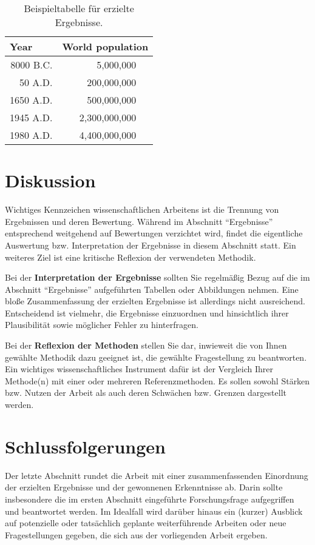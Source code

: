 \documentclass{svproc}
\begin{document}
\begin{table}
    \caption{Beispieltabelle für erzielte Ergebnisse.}
    \begin{center}
        \begin{tabular}{r@{\quad}rl}
            \hline
            \multicolumn{1}{l}{\rule{0pt}{12pt}
                   Year}&\multicolumn{2}{l}{World population}\\[2pt]
                                    \hline\rule{0pt}{12pt}
                    8000 B.C.  &     5,000,000& \\
                    50 A.D.  &   200,000,000& \\
                    1650 A.D.  &   500,000,000& \\
                    1945 A.D.  & 2,300,000,000& \\
                    1980 A.D.  & 4,400,000,000& \\[2pt]
                    \hline
        \end{tabular}
    \end{center}
    \label{tab1}
\end{table}
%
%
\section{Diskussion}
%
Wichtiges Kennzeichen wissenschaftlichen Arbeitens ist die Trennung von Ergebnissen und deren Bewertung. Während im Abschnitt ``Ergebnisse'' entsprechend weitgehend auf Bewertungen verzichtet wird, findet die eigentliche Auswertung bzw. Interpretation der Ergebnisse in diesem Abschnitt statt. Ein weiteres Ziel ist eine kritische Reflexion der verwendeten Methodik. 

Bei der \textbf{Interpretation der Ergebnisse} sollten Sie regelmäßig Bezug auf die im Abschnitt ``Ergebnisse'' aufgeführten Tabellen oder Abbildungen nehmen. Eine bloße Zusammenfassung der erzielten Ergebnisse ist allerdings nicht ausreichend. Entscheidend ist vielmehr, die Ergebnisse einzuordnen und hinsichtlich ihrer Plausibilität sowie möglicher Fehler zu hinterfragen.
    
Bei der \textbf{Reflexion der Methoden} stellen Sie dar, inwieweit die von Ihnen gewählte Methodik dazu geeignet ist, die gewählte Fragestellung zu beantworten. Ein wichtiges wissenschaftliches Instrument dafür ist der Vergleich Ihrer Methode(n) mit einer oder mehreren Referenzmethoden. Es sollen sowohl Stärken bzw. Nutzen der Arbeit als auch deren Schwächen bzw. Grenzen dargestellt werden.
%
%
\section{Schlussfolgerungen}
%
Der letzte Abschnitt rundet die Arbeit mit einer zusammenfassenden Einordnung der erzielten Ergebnisse und der gewonnenen Erkenntnisse ab. Darin sollte insbesondere die im ersten Abschnitt eingeführte Forschungsfrage aufgegriffen und beantwortet werden. Im Idealfall wird darüber hinaus ein (kurzer) Ausblick auf potenzielle oder tatsächlich geplante weiterführende Arbeiten oder neue Fragestellungen gegeben, die sich aus der vorliegenden Arbeit ergeben.


%
%
%


\end{document}
